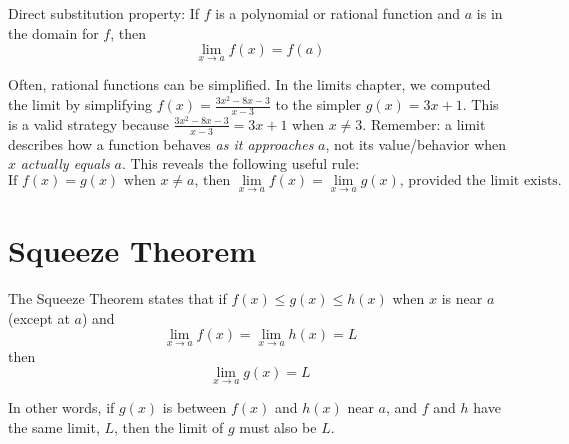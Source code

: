 Direct substitution property: If $f$ is a polynomial or rational function and $a$ 
is in the domain for $f$, then $$\lim_{x \to a}f(x) = f(a)$$

Often, rational functions can be simplified. In the limits chapter, we computed the
limit by simplifying $f(x) = \frac{3x^2-8x-3}{x-3}$ to the simpler $g(x) = 3x+1$. 
This is a valid strategy because $\frac{3x^2-8x-3}{x-3} = 3x+1$ when $x \neq 3$. 
Remember: a limit describes how a function behaves \textit{as it approaches} $a$, 
not its value/behavior when $x$ \textit{actually equals} $a$. This reveals the 
following useful rule: 
$$\text{If } f(x)=g(x) \text{ when } x \neq a \text{, then } 
\lim_{x \to a}f(x) = \lim_{x \to a}g(x) \text{, provided the limit exists.}$$

\section{Squeeze Theorem}

The Squeeze Theorem states that if $f(x) \leq g(x) \leq h(x)$ when $x$ is near $a$ 
(except at $a$) and $$\lim_{x \to a}f(x)=\lim_{x \to a}h(x) = L$$ then $$\lim_{x 
\to a}g(x) = L$$

In other words, if $g(x)$ is between $f(x)$ and $h(x)$ near $a$, and $f$ and $h$ have the 
same limit, $L$, then the limit of $g$ must also be $L$. 

